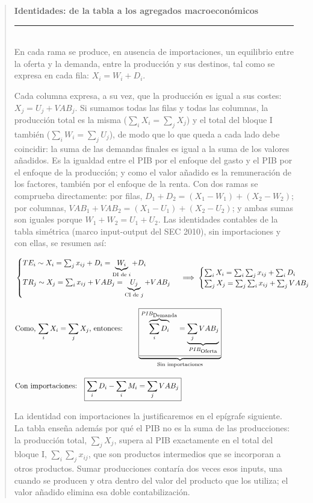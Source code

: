 \documentclass[10pt,a4paper]{article}
\newenvironment{specialblock}[1]{%
      \begin{quote} %
      \small %
      \noindent\textbf{#1}\\[-0.3em] %
      \rule{\linewidth}{0.4pt}\\[0.6em]}{
      \end{quote}}
\begin{document}
\begin{specialblock}{\textbf{Identidades:} de la tabla a los agregados macroeconómicos}
  En cada rama se produce, en ausencia de importaciones, un equilibrio entre la oferta y la demanda, entre la producción y sus destinos, tal como se expresa en cada fila: $X_i=W_i+D_i$. 

  Cada columna expresa, a su vez, que la producción es igual a sus costes: $X_j=U_j+VAB_j$. Si sumamos todas las filas y todas las columnas, la producción total es la misma ($\sum_i X_i=\sum_j X_j$) y el total del bloque I también ($\sum_i W_i=\sum_j U_j$), de modo que lo que queda a cada lado debe coincidir: la suma de las demandas finales es igual a la suma de los valores añadidos. Es la igualdad entre el PIB por el enfoque del gasto y el PIB por el enfoque de la producción; y como el valor añadido es la remuneración de los factores, también por el enfoque de la renta. Con dos ramas se comprueba directamente: por filas, $D_1+D_2=(X_1-W_1)+(X_2-W_2)$; por columnas, $VAB_1+VAB_2=(X_1-U_1)+(X_2-U_2)$; y ambas sumas son iguales porque $W_1+W_2=U_1+U_2$. Las identidades contables de la tabla simétrica (marco input-output del SEC 2010), sin importaciones y con ellas, se resumen así:
  
  $$\begin{aligned}
  &\begin{cases}
      TE_i\sim X_i=\sum_jx_{ij}+D_i=\underbrace{W_i}_{\text{DI de $i$}}+D_i\\[0.5em]
      TR_j\sim X_j=\sum_ix_{ij}+VAB_j=\underbrace{U_j}_{\text{CI de $j$}}+VAB_j
  \end{cases}\;\Longrightarrow\;
  \begin{cases}
      \sum_iX_i=\sum_i\sum_jx_{ij}+\sum_iD_i\\
      \sum_jX_j=\sum_j\sum_ix_{ij}+\sum_jVAB_j
  \end{cases}\\[1em]
  &\text{Como, $\sum_iX_i=\sum_jX_j$, entonces:}\qquad
  \underbrace{\boxed{\overbrace{\sum_iD_i}^{PIB_{\text{\scriptsize Demanda}}}=\underbrace{\sum_jVAB_j}_{PIB_{\text{\scriptsize Oferta}}}}}_{\text{Sin importaciones}}\\[1em]
  &\text{Con importaciones:}\quad \boxed{\sum_iD_i-\sum_iM_i=\sum_jVAB_j}
  \end{aligned}$$

  La identidad con importaciones la justificaremos en el epígrafe siguiente. La tabla enseña además por qué el PIB no es la suma de las producciones: la producción total, $\sum_j X_j$, supera al PIB exactamente en el total del bloque I, $\sum_i\sum_j x_{ij}$, que son productos intermedios que se incorporan a otros productos. Sumar producciones contaría dos veces esos inputs, una cuando se producen y otra dentro del valor del producto que los utiliza; el valor añadido elimina esa doble contabilización.
\end{specialblock}
\end{document}
